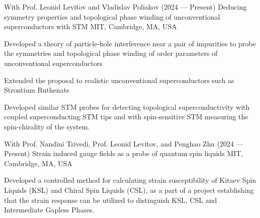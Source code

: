 \begin{cventries}
	\cventry
	{With Prof. Leonid Levitov and Vladislav Poliakov (2024 --- Present)} %
	{Deducing symmetry properties and topological phase winding of unconventional superconductors with STM} %
	{MIT, Cambridge, MA, USA} %
	{} %
	{
		\begin{cvitems} %
			\item{Developed a theory of particle-hole interference near a pair of impurities to probe the symmetries and topological phase winding of order parameters of unconventional superconductors}
			\item{Extended the proposal to realistic unconventional superconductors such as Strontium Ruthenate}
			\item{Developed similar STM probes for detecting topological superconductivity with coupled superconducting STM tips and with spin-sensitive STM measuring the spin-chirality of the system.}
		\end{cvitems}
	}

\cventry
{With Prof. Nandini Trivedi, Prof. Leonid Levitov, and Penghao Zhu (2024 --- Present)} %
{Strain induced gauge fields as a probe of quantum spin liquids} %
{MIT, Cambridge, MA, USA} %
{} %
{
	\begin{cvitems} %
		\item{Developed a controlled method for calculating strain susceptibility of Kitaev Spin Liquids (KSL) and Chiral Spin Liquids (CSL), as a part of a project establishing that the strain response can be utilized to distinguish KSL, CSL and Intermediate Gapless Phases.}
	\end{cvitems}
}


\end{cventries}
